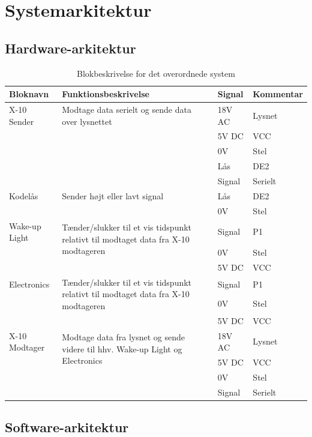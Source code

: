 \documentclass[11pt]{article}
\begin{document}
\section{Systemarkitektur}
\subsection{Hardware-arkitektur}
\begin{table}[!ht]
\centering
	\begin{tabular}{l|p{10cm}|l|l}
	
	\toprule[0.4mm]\midrule Bloknavn & Funktionsbeskrivelse & Signal & Kommentar\\ \midrule[0.4mm]
	X-10 Sender & Modtage data serielt og sende data over lysnettet & 18V AC & Lysnet\\
	 & & 5V DC & VCC\\
	 & & 0V & Stel\\
	 & & Lås & DE2\\
	 & & Signal & Serielt\\
	 \midrule
	 Kodelås & Sender højt eller lavt signal & Lås & DE2\\
	 & & 0V & Stel\\
	 \midrule
	 Wake-up Light & \multirow{2}{10cm}{Tænder/slukker til et vis tidspunkt relativt til modtaget data fra X-10 modtageren \vfill}  & Signal & P1\\
	 & & 0V & Stel\\
	 & & 5V DC & VCC\\
	 \midrule
	 Electronics & \multirow{2}{10cm}{Tænder/slukker til et vis tidspunkt relativt til modtaget data fra X-10 modtageren \vfill}  & Signal & P1\\
	 & & 0V & Stel\\
	 & & 5V DC & VCC\\
	 \midrule
	 X-10 Modtager & \multirow{2}{10cm}{Modtage data fra lysnet og sende videre til hhv. Wake-up Light og Electronics \vfill} & 18V AC & Lysnet\\
	 & & 5V DC & VCC\\
	 & & 0V & Stel\\
	 & & Signal & Serielt\\
	 \midrule\bottomrule[0.4mm]



	\end{tabular}
	\caption{Blokbeskrivelse for det overordnede system}
	\label{tab: Bloktabel}
\end{table}

\subsection{Software-arkitektur}
\end{document}

